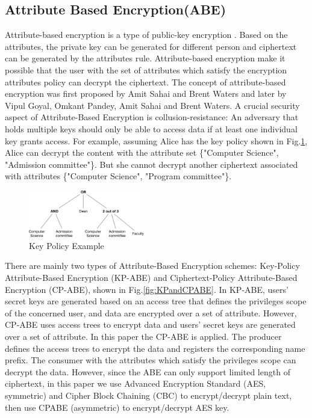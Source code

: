 \subsection{Attribute Based Encryption(ABE)}
Attribute-based encryption is a type of public-key encryption \cite{brucker2010attribute}. Based on the attributes, the private key can be generated for different person and ciphertext can be generated by the attributes rule. Attribute-based encryption make it possible that the user with the set of attributes which satisfy the encryption attributes policy can decrypt the ciphertext. The concept of attribute-based encryption was first proposed by Amit Sahai and Brent Waters \cite{sahai2005fuzzy} and later by Vipul Goyal, Omkant Pandey, Amit Sahai and Brent Waters\cite{goyal2006attribute}. A crucial security aspect of Attribute-Based Encryption is collusion-resistance: An adversary that holds multiple keys should only be able to access data if at least one individual key grants access. For example, assuming Alice has the key policy shown in Fig.\ref{fig:abeKey}, Alice can decrypt the content with the attribute set \{"Computer Science", "Admission committee"\}. But she cannot decrypt another ciphertext associated with attributes \{"Computer Science", "Program committee"\}.

\begin{figure}
  \centering
  \includegraphics[width=0.45\textwidth]{Figures/ABEExample}
  \caption{Key Policy Example}
  \label{fig:abeKey}
\end{figure}

There are mainly two types of Attribute-Based Encryption schemes: Key-Policy Attribute-Based Encryption (KP-ABE)\cite{goyal2006attribute} and Ciphertext-Policy Attribute-Based Encryption (CP-ABE)\cite{bethencourt2007ciphertext}, shown in Fig.\ref{fig:KPandCPABE}. In KP-ABE, users' secret keys are generated based on an access tree that defines the privileges scope of the concerned user, and data are encrypted over a set of attribute. However, CP-ABE uses access trees to encrypt data and users' secret keys are generated over a set of attribute. In this paper the CP-ABE is applied. The producer defines the access trees to encrypt the data and registers the corresponding  name prefix. The consumer with the attributes which satisfy the privileges scope can decrypt the data. However, since the ABE can only support limited length of ciphertext, in this paper we use Advanced Encryption Standard (AES, symmetric) and Cipher Block Chaining (CBC) to encrypt/decrypt plain text, then use CPABE (asymmetric) to encrypt/decrypt AES key.

